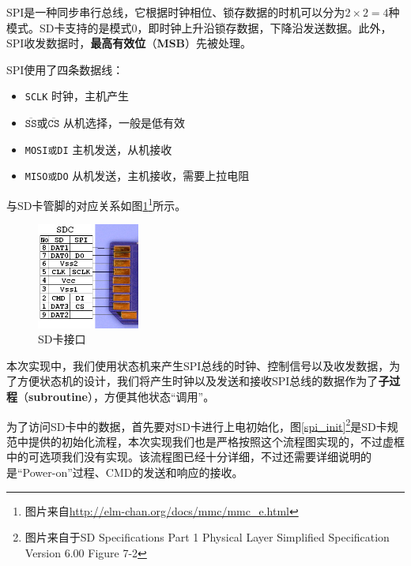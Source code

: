\documentclass[11pt,utf8]{report}
\begin{document}
	\par SPI是一种同步串行总线，它根据时钟相位、锁存数据的时机可以分为$2 \times 2=4$种模式。SD卡支持的是模式0，即时钟上升沿锁存数据，下降沿发送数据。此外，SPI收发数据时，\textbf{最高有效位}（\textbf{MSB}）先被处理。
	\par SPI使用了四条数据线：
	\begin{itemize}
		\item \texttt{SCLK} 时钟，主机产生
		\item \texttt{$\mathtt{\overline{SS}}\mbox{或}\mathtt{\overline{CS}}$} 从机选择，一般是低有效
		\item \texttt{MOSI或DI} 主机发送，从机接收
		\item \texttt{MISO或DO} 从机发送，主机接收，需要上拉电阻
	\end{itemize}
	
	与SD卡管脚的对应关系如图\ref{sd}\footnote{图片来自\url{http://elm-chan.org/docs/mmc/mmc\_e.html}}所示。
	
	\begin{figure}[h!]
		\centering
		\includegraphics[width=0.3\textwidth]{sd}
		\caption{SD卡接口}
		\label{sd}
	\end{figure}
	
	\par 本次实现中，我们使用状态机来产生SPI总线的时钟、控制信号以及收发数据，为了方便状态机的设计，我们将产生时钟以及发送和接收SPI总线的数据作为了\textbf{子过程}（\textbf{subroutine}），方便其他状态“调用”。
	
	\par 为了访问SD卡中的数据，首先要对SD卡进行上电初始化，图\ref{spi_init}\footnote{图片来自于SD Specifications Part 1 Physical Layer Simplified Specification Version 6.00 Figure 7-2}是SD卡规范中提供的初始化流程，本次实现我们也是严格按照这个流程图实现的，不过虚框中的可选项我们没有实现。该流程图已经十分详细，不过还需要详细说明的是“Power-on”过程、CMD的发送和响应的接收。
	
\end{document}

